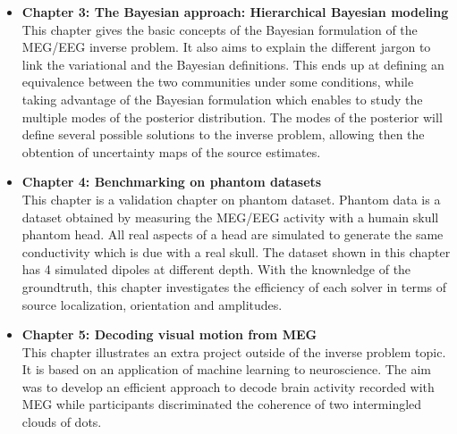 \begin{itemize}
\item \textbf{Chapter 3: The Bayesian approach: Hierarchical Bayesian modeling}\\
This chapter gives the basic concepts of the Bayesian formulation of the MEG/EEG inverse problem. It also aims to explain the different jargon to link the variational and the Bayesian definitions. This ends up at defining an equivalence between the two communities under some conditions, while taking advantage of the Bayesian formulation which enables to study the multiple modes of the posterior distribution. The modes of the posterior will define several possible solutions to the inverse problem, allowing then the obtention of uncertainty maps of the source estimates. 

\item \textbf{Chapter 4: Benchmarking on phantom datasets}\\
This chapter is a validation chapter on phantom dataset. Phantom data is a dataset obtained by measuring the MEG/EEG activity with a humain skull phantom head. All real aspects of a head are simulated to generate the same conductivity which is due with a real skull. The dataset shown in this chapter has 4 simulated dipoles at different depth. With the knownledge of the groundtruth, this chapter investigates the efficiency of each solver in terms of source localization, orientation and amplitudes.

\item \textbf{Chapter 5: Decoding visual motion from MEG}\\
This chapter illustrates an extra project outside of the inverse problem topic. It is based on an application of machine learning to neuroscience. The aim was to develop an efficient approach to decode brain activity recorded with MEG while participants discriminated the coherence of two intermingled clouds of dots.
\end{itemize}
